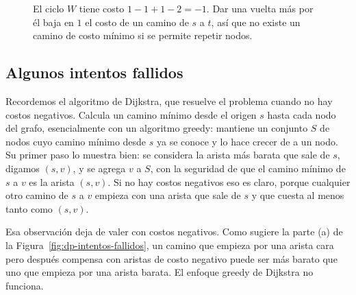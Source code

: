 \documentclass[12pt, spanish, oneside, openany]{book}
\theoremstyle{uprightplain}
\theoremstyle{definition}
\theoremstyle{remark}
\theoremstyle{definition}
\begin{document}
\begin{figure}[H]
\centering
{}
\caption{El ciclo $W$ tiene costo $1-1+1-2=-1$. Dar una vuelta más por él baja
en $1$ el costo de un camino de $s$ a $t$, así que no existe un camino de costo
mínimo si se permite repetir nodos.}
\label{fig:dp-ciclo-negativo}
\end{figure}

\subsection{Algunos intentos fallidos}

Recordemos el algoritmo de Dijkstra, que resuelve el problema cuando no hay costos negativos. Calcula un camino mínimo desde el origen $s$ hasta cada nodo del grafo, esencialmente con un algoritmo greedy: mantiene un conjunto $S$ de nodos cuyo camino mínimo desde $s$ ya se conoce y lo hace crecer de a un nodo. Su primer paso lo muestra bien: se considera la arista más barata que sale de $s$, digamos $(s,v)$, y se agrega $v$ a $S$, con la seguridad de que el camino mínimo de $s$ a $v$ es la arista $(s,v)$. Si no hay costos negativos eso es claro, porque cualquier otro camino de $s$ a $v$ empieza con una arista que sale de $s$ y que cuesta al menos tanto como $(s,v)$.

Esa observación deja de valer con costos negativos. Como sugiere la parte (a) de la Figura~\ref{fig:dp-intentos-fallidos}, un camino que empieza por una arista cara pero después compensa con aristas de costo negativo puede ser más barato que uno que empieza por una arista barata. El enfoque greedy de Dijkstra no funciona.
\end{document}

